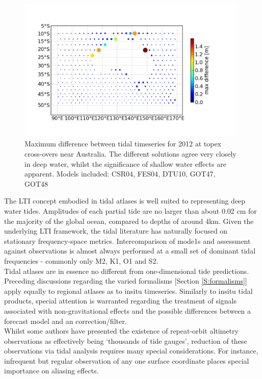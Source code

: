 \begin{figure}[h]
\begin{center}
\includegraphics[width=110mm]{figures/maps/map_tide_differences_tpx_xovers.png}
\caption{Maximum difference between tidal timeseries for 2012 at topex cross-overs near Australia.  The different solutions agree very closely in deep water, whilst the significance of shallow water effects are apparent.  Models included: CSR04\citep{Eanes:1996tr}, FES04\citep{Lyard:2006ir}, DTU10\citep{IMPROVEMENTOFGLOBA:2010tu}, GOT47, GOT48\citep{Schrama:1994vr}\citep{Ray:1999vm} }
\label{fig:tpx_cross}
\end{center}
\end{figure}


The LTI concept embodied in tidal atlases is well suited to representing deep water tides.   Amplitudes of each partial tide are no larger than about 0.02 cm for the majority of the global ocean, compared to depths of around 4km.
Given the underlying LTI framework, the tidal literature has naturally focused on stationary frequency-space metrics.  Intercomparison of mode1s and assessment against observations is almost always performed at a small set of dominant tidal frequencies - commonly only M2, K1, O1 and S2.\\
Tidal atlases are in essence no different from one-dimensional tide predictions.   Preceding discussions regarding the varied formalisms [Section \ref{S:formalisms}] apply equally to regional atlases as to insitu timeseries.  Similarly to insitu tidal products, special attention is warranted regarding the treatment of signals associated with non-gravitational effects and the possible differences between a forecast model and an correction/filter.\\



Whilst some authors have presented the existence of repeat-orbit altimetry observations as effectively being `thousands of tide gauges', reduction of these observations via tidal analysis requires many special considerations.  For instance, infrequent but regular observation of any one surface coordinate places special importance on aliasing effects.\\



